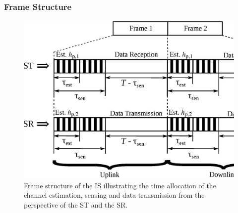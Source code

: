 

\subsubsection{Frame Structure}
\begin{figure}[!ht]
\centering
\includegraphics[width = \columnwidth]{figures/Frame_Structure}
\caption{Frame structure of the IS illustrating the time allocation of the channel estimation, sensing and data transmission from the perspective of the ST and the SR.} %
\label{fig_IS:fs}
\end{figure}
